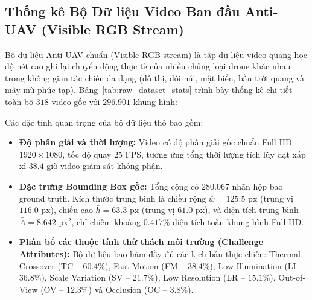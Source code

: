 \documentclass[11pt,a4paper]{article}
\begin{document}
\subsection{Thống kê Bộ Dữ liệu Video Ban đầu Anti-UAV (Visible RGB Stream)}
Bộ dữ liệu Anti-UAV chuẩn (Visible RGB stream) là tập dữ liệu video quang học độ nét cao ghi lại chuyển động thực tế của nhiều chủng loại drone khác nhau trong không gian tác chiến đa dạng (đô thị, đồi núi, mặt biển, bầu trời quang và mây mù phức tạp). Bảng~\ref{tab:raw_dataset_stats} trình bày thống kê chi tiết toàn bộ $318$ video gốc với $296.901$ khung hình:

\begin{table}[htbp]
\centering
\caption{Thống kê định lượng toàn diện bộ dữ liệu video thô Anti-UAV (Visible RGB Stream).}
\label{tab:raw_dataset_stats}
\end{table}

Các đặc tính quan trọng của bộ dữ liệu thô bao gồm:
\begin{itemize}
    \item \textbf{Độ phân giải và thời lượng:} Video có độ phân giải gốc chuẩn Full HD $1920 \times 1080$, tốc độ quay $25$ FPS, tương ứng tổng thời lượng tích lũy đạt xấp xỉ $38.4$ giờ video giám sát không phận.
    \item \textbf{Đặc trưng Bounding Box gốc:} Tổng cộng có $280.067$ nhãn hộp bao ground truth. Kích thước trung bình là chiều rộng $\bar{w} = 125.5\text{ px}$ (trung vị $116.0\text{ px}$), chiều cao $\bar{h} = 63.3\text{ px}$ (trung vị $61.0\text{ px}$), và diện tích trung bình $\bar{A} = 8.642\text{ px}^2$, chỉ chiếm khoảng $0.417\%$ diện tích toàn khung hình Full HD.
    \item \textbf{Phân bố các thuộc tính thử thách môi trường (Challenge Attributes):} Bộ dữ liệu bao hàm đầy đủ các kịch bản thực chiến: Thermal Crossover (TC -- $60.4\%$), Fast Motion (FM -- $38.4\%$), Low Illumination (LI -- $36.8\%$), Scale Variation (SV -- $21.7\%$), Low Resolution (LR -- $15.1\%$), Out-of-View (OV -- $12.3\%$) và Occlusion (OC -- $3.8\%$).
\end{itemize}
\end{document}
